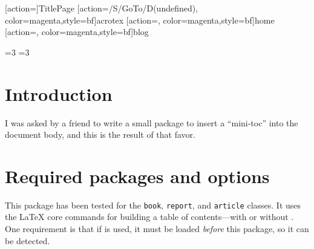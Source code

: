 \documentclass[10pt]{article}
\begin{document}
\maketitle

[action={}]{TitlePage}
[action={/S/GoTo/D(undefined)},%
  color=magenta,style={bf}]{acrotex}
[action={},%
  color=magenta,style={bf}]{home}
[action={},%
  color=magenta,style={bf}]{blog}


\bgroup
\value{secnumdepth}=3
\value{tocdepth}=3
\tableofcontents
\egroup
{}

\def\AcroT{Acro\!\TeX}\def\cAcroT{\textcolor{blue}{\AcroT}}
\def\AcroEB{\AcroT{} eDucation Bundle}\def\cAcroEB{\textcolor{blue}{\AcroEB}}
\def\AcroB{\AcroT{} Bundle}\def\cAcroB{\textcolor{blue}{\AcroB}}
\def\bUrl{http://www.math.uakron.edu/~dpstory}

\hypersetup{linktocpage}

\section{Introduction}

I was asked by a friend to write a small package to insert a ``mini-toc'' into
the document body, and this is the result of that favor.



\section{Required packages and options}

This package has been tested for the \texttt{book}, \texttt{report}, and \texttt{article} classes. It uses
the {\LaTeX} core commands for building a table of contents---with or without . One requirement
is that if  is used, it must be loaded \textit{before} this package, so it can be detected.
\end{document}
